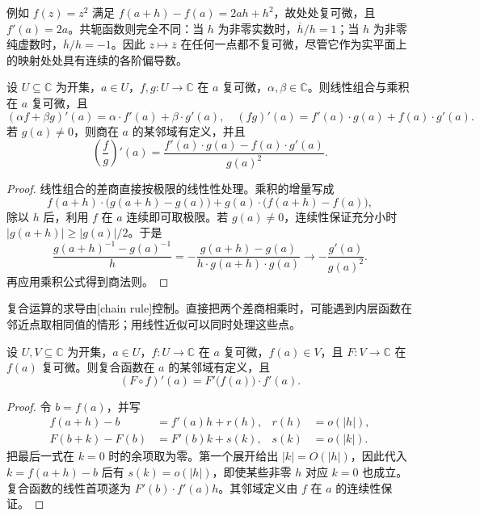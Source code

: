 \ProseParagraphBreak

例如 \(f(z)=z^2\) 满足 \(f(a+h)-f(a)=2ah+h^2\)，故处处复可微，且 \(f'(a)=2a\)。共轭函数则完全不同：当 \(h\) 为非零实数时，\(\overline h/h=1\)；当 \(h\) 为非零纯虚数时，\(\overline h/h=-1\)。因此 \(z\mapsto\overline z\) 在任何一点都不复可微，尽管它作为实平面上的映射处处具有连续的各阶偏导数。

\begin{proposition}\label{b3:prop:01-complex-derivative-rules}
设 \(U\subseteq\mathbb C\) 为开集，\(a\in U\)，\(f,g:U\to\mathbb C\) 在 \(a\) 复可微，\(\alpha,\beta\in\mathbb C\)。则线性组合与乘积在 \(a\) 复可微，且
\[
 (\alpha f+\beta g)'(a)=\alpha\cdot f'(a)+\beta\cdot g'(a),
 \quad
 (fg)'(a)=f'(a)\cdot g(a)+f(a)\cdot g'(a).
\]
若 \(g(a)\ne0\)，则商在 \(a\) 的某邻域有定义，并且
\[
 \left(\frac fg\right)'(a)
 =\frac{f'(a)\cdot g(a)-f(a)\cdot g'(a)}{g(a)^2}.
\]
\end{proposition}
\begin{proof}
线性组合的差商直接按极限的线性性处理。乘积的增量写成
\[
 f(a+h)\cdot\bigl(g(a+h)-g(a)\bigr)
 +g(a)\cdot\bigl(f(a+h)-f(a)\bigr),
\]
除以 \(h\) 后，利用 \(f\) 在 \(a\) 连续即可取极限。若 \(g(a)\ne0\)，连续性保证充分小时 \(\lvert g(a+h)\rvert\geq\lvert g(a)\rvert/2\)。于是
\[
 \frac{g(a+h)^{-1}-g(a)^{-1}}h
 =-\frac{g(a+h)-g(a)}{h\cdot g(a+h)\cdot g(a)}
 \longrightarrow-\frac{g'(a)}{g(a)^2}.
\]
再应用乘积公式得到商法则。
\end{proof}

复合运算的求导由[chain rule]控制。直接把两个差商相乘时，可能遇到内层函数在邻近点取相同值的情形；用线性近似可以同时处理这些点。

\begin{proposition}[链式法则]\label{b3:prop:01-complex-chain-rule}
设 \(U,V\subseteq\mathbb C\) 为开集，\(a\in U\)，\(f:U\to\mathbb C\) 在 \(a\) 复可微，\(f(a)\in V\)，且 \(F:V\to\mathbb C\) 在 \(f(a)\) 复可微。则复合函数在 \(a\) 的某邻域有定义，且
\[
 (F\circ f)'(a)=F'\bigl(f(a)\bigr)\cdot f'(a).
\]
\end{proposition}
\begin{proof}
令 \(b=f(a)\)，并写
\[
 \begin{aligned}
 f(a+h)-b&=f'(a)h+r(h),&r(h)&=o(\lvert h\rvert),\\
 F(b+k)-F(b)&=F'(b)k+s(k),&s(k)&=o(\lvert k\rvert).
 \end{aligned}
\]
把最后一式在 \(k=0\) 时的余项取为零。第一个展开给出 \(\lvert k\rvert=O(\lvert h\rvert)\)，因此代入 \(k=f(a+h)-b\) 后有 \(s(k)=o(\lvert h\rvert)\)，即使某些非零 \(h\) 对应 \(k=0\) 也成立。复合函数的线性首项遂为 \(F'(b)\cdot f'(a)h\)。其邻域定义由 \(f\) 在 \(a\) 的连续性保证。
\end{proof}

